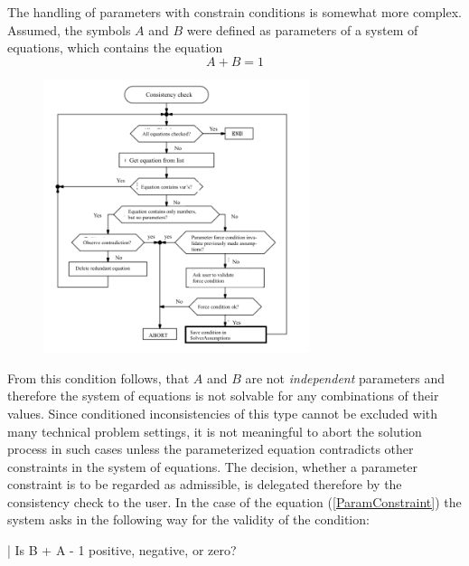 The handling of parameters with constrain conditions is somewhat more complex. Assumed, the symbols $A$ and $B$ were defined as parameters of a system of equations, which contains the equation 
\begin{equation} \label{ParamConstraint}
A + B = 1
\end{equation}

\begin {figure} [htbp]
\begin {center}
\includegraphics[height=8cm]{ConschkEn.png}
\caption {}
\end {center}
\end {figure}


From this condition follows, that $A$ and $B$ are not {\em independent} parameters and therefore the system of equations is not solvable for any combinations of their values. Since conditioned inconsistencies of this type cannot be excluded with many technical problem settings, it is not meaningful to abort the solution process in such cases unless the parameterized equation contradicts  other constraints  in the system of equations. The decision, whether a parameter constraint is to be regarded as admissible, is delegated therefore by the consistency check to the user. In the case of the equation (\ref{ParamConstraint}) the system asks in the following way for the validity of the condition:
\begin{literatim}{|}
Is   B + A - 1   positive, negative, or zero?
\end{literatim}

